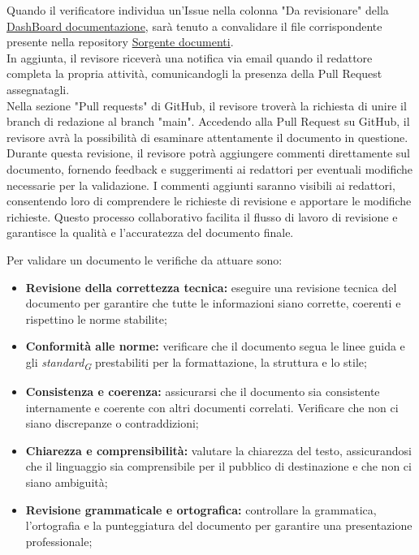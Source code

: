 Quando il verificatore individua un'Issue nella colonna "Da revisionare" della \href{https://github.com/orgs/ByteOps-swe/projects/1/views/1}{DashBoard documentazione}, sarà tenuto a convalidare il file corrispondente presente nella repository \href{https://github.com/ByteOps-swe/Sorgente-documenti}{Sorgente documenti}. \\
In aggiunta, il revisore riceverà una notifica via email quando il redattore completa la propria attività, comunicandogli la presenza della Pull Request assegnatagli.\\
Nella sezione "Pull requests" di GitHub, il revisore troverà la richiesta di unire il branch di redazione al branch "main". Accedendo alla Pull Request su GitHub, il revisore avrà la possibilità di esaminare attentamente il documento in questione. Durante questa revisione, il revisore potrà aggiungere commenti direttamente sul documento, fornendo feedback e suggerimenti ai redattori per eventuali modifiche necessarie per la validazione. I commenti aggiunti saranno visibili ai redattori, consentendo loro di comprendere le richieste di revisione e apportare le modifiche richieste. Questo processo collaborativo facilita il flusso di lavoro di revisione e garantisce la qualità e l'accuratezza del documento finale.

\vspace{0.3cm}

Per validare un documento le verifiche da attuare sono:
\begin{itemize}
    \item \textbf{Revisione della correttezza tecnica:} 
        eseguire una revisione tecnica del documento per garantire che tutte le informazioni siano corrette, coerenti e rispettino le norme stabilite; 
    \item \textbf{Conformità alle norme:} 
        verificare che il documento segua le linee guida e gli \textit{standard}\textsubscript{\textit{G}} prestabiliti per la formattazione, la struttura e lo stile; 
    \item \textbf{Consistenza e coerenza:} 
        assicurarsi che il documento sia consistente internamente e coerente con altri documenti correlati. Verificare che non ci siano discrepanze o contraddizioni;
    \item \textbf{Chiarezza e comprensibilità:} 
        valutare la chiarezza del testo, assicurandosi che il linguaggio sia comprensibile per il pubblico di destinazione e che non ci siano ambiguità;
    \item \textbf{Revisione grammaticale e ortografica:} 
        controllare la grammatica, l'ortografia e la punteggiatura del documento per garantire una presentazione professionale;
\end{itemize}

